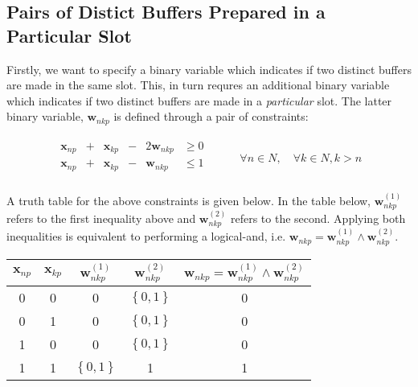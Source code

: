 \subsection{Pairs of Distict Buffers Prepared in a Particular Slot}\label{SS.constr6}

Firstly, we want to specify a binary variable which indicates if two distinct
buffers are made in the same slot.  
This, in turn requres an additional binary variable which indicates if two
distinct buffers are made in a \emph{particular} slot.
The latter binary variable, $ \boldsymbol{w}_{nkp} $ is defined through a pair
of constraints:

\begin{equation}
    \begin{split}
        \begin{alignedat}{3}
            \boldsymbol{x}_{np} & {}+{} & \boldsymbol{x}_{kp} & {}-{} & 2 
            \boldsymbol{w}_{nkp} & \ge 0\\
            \boldsymbol{x}_{np} & {}+{} & \boldsymbol{x}_{kp} & {}-{} &
            \boldsymbol{w}_{nkp} & \le 1\\
        \end{alignedat}
    \end{split}
    \quad\quad
    \begin{split}
        \forall n \in N, \quad \forall k \in N, k > n
    \end{split}
\end{equation}

A truth table for the above constraints is given below.
In the table below, $\boldsymbol{w}_{nkp}^{\left( 1 \right)}$ refers to the 
first inequality above and $\boldsymbol{w}_{nkp}^{\left( 2 \right)}$ refers to
the second.  Applying both inequalities is equivalent to performing a
logical-and, i.e. 
$\boldsymbol{w}_{nkp} = \boldsymbol{w}_{nkp}^{\left( 1 \right)} \land
\boldsymbol{w}_{nkp}^{\left( 2 \right)}$.

\begin{center}
    \begin{tabular}{c c | c c | c}
        $\boldsymbol{x}_{np}$ & $\boldsymbol{x}_{kp}$ & 
        $\boldsymbol{w}_{nkp}^{\left( 1 \right)}$ &
        $\boldsymbol{w}_{nkp}^{\left( 2 \right)}$ & 
        $\boldsymbol{w}_{nkp} = \boldsymbol{w}_{nkp}^{\left( 1 \right)}
            \land \boldsymbol{w}_{nkp}^{\left( 2 \right)}
        $\\ \hline
        0 & 0 & 0 & $\left\{ 0,1 \right\}$ & 0\\
        0 & 1 & 0 & $\left\{ 0,1 \right\}$ & 0\\
        1 & 0 & 0 & $\left\{ 0,1 \right\}$ & 0\\
        1 & 1 & $\left\{ 0,1 \right\}$ & 1 & 1\\
    \end{tabular}
\end{center}

